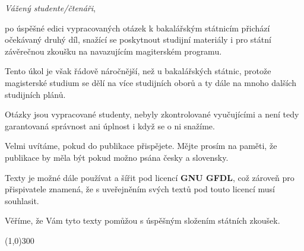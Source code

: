 \emph{Vážený studente/čtenáři},

po úspěšné edici vypracovaných otázek k bakalářským státnicím přichází očekávaný druhý díl, snažící se poskytnout studijní materiály i pro státní závěrečnou zkoušku na navazujícím magiterském programu.

Tento úkol je však řádově náročnější, než u bakalářských státnic, protože magisterské studium se dělí na více studijních oborů a ty dále na mnoho dalších studijních plánů.

Otázky jsou vypracované studenty, nebyly zkontrolované vyučujícími a není tedy garantovaná správnost ani úplnost i když se o ni snažíme.   

Velmi uvítáme, pokud do publikace přispějete. Mějte prosím na paměti, že publikace by měla být pokud možno psána česky a slovensky.

Texty je možné dále používat a šířit pod licencí \textbf{GNU GFDL}, což zároveň pro přispivatele znamená, že s uveřejněním svých textů pod touto licencí musí souhlasit. 

Věříme, že Vám tyto texty pomůžou s úspěšným složením státních zkoušek.

\begin{center}
\line(1,0){300}
\end{center}
